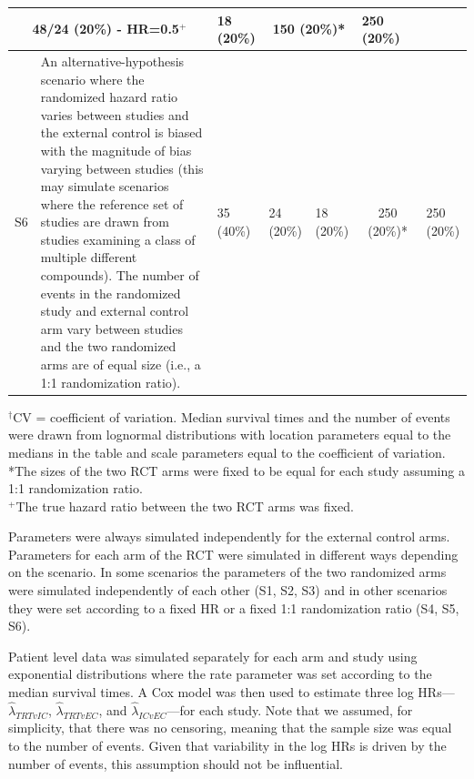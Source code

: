 \documentclass[11pt,final,fleqn]{article}\usepackage[]{graphicx}\usepackage[]{color}
\begin{document}
\begin{table}
\begin{center}
\begin{threeparttable}
\begin{tabular}{lm{6cm}llllll}
\multicolumn{2}{c}{48/24 (20\%) - HR=0.5$^+$} &
18 (20\%) &
\multicolumn{2}{c}{150 (20\%)*} &
250 (20\%) \\
\hline
S6 &
An alternative-hypothesis scenario where the randomized hazard ratio varies between studies and the external control is biased with the magnitude of bias varying between studies (this may simulate scenarios where the reference set of studies are drawn from studies examining a class of multiple different compounds). The number of events in the randomized study and external control arm vary between studies and the two randomized arms are of equal size (i.e., a 1:1 randomization ratio). &
35 (40\%) &
24 (20\%) &
18 (20\%) &
\multicolumn{2}{c}{250 (20\%)*} &
250 (20\%) \\
\hline
\end{tabular}
\scriptsize 
$^\dagger$CV = coefficient of variation. Median survival times and the number of events were drawn from lognormal distributions with location parameters equal to the medians in the table and scale parameters equal to the coefficient of variation. \\
*The sizes of the two RCT arms were fixed to be equal for each study assuming a 1:1 randomization ratio. \\
$^+$The true hazard ratio between the two RCT arms was fixed.
\end{threeparttable}
\end{center}
\end{table}

Parameters were always simulated independently for the external control arms. Parameters for each arm of the RCT were simulated in different ways depending on the scenario. In some scenarios the parameters of the two randomized arms were simulated independently of each other (S1, S2, S3) and in other scenarios they were set according to a fixed HR or a fixed 1:1 randomization ratio (S4, S5, S6).

Patient level data was simulated separately for each arm and study using exponential distributions where the rate parameter was set according to the median survival times. A Cox model was then used to estimate three log HRs---$\hat{\lambda}_{TRTvIC}$, $\hat{\lambda}_{TRTvEC}$, and $\hat{\lambda}_{ICvEC}$---for each study.  Note that we assumed, for simplicity, that there was no censoring, meaning that the sample size was equal to the number of events. Given that variability in the log HRs is driven by the number of events, this assumption should not be influential. 
\end{document}
